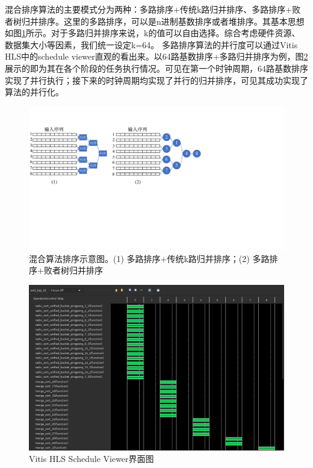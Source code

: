 混合排序算法的主要模式分为两种：多路排序+传统k路归并排序、多路排序+败者树归并排序。这里的多路排序，可以是n进制基数排序或者堆排序。其基本思想如图\ref{fig:k_way_sorting}所示。对于多路归并排序来说，k的值可以自由选择。综合考虑硬件资源、数据集大小等因素，我们统一设定k=64。
多路排序算法的并行度可以通过Vitis HLS中的schedule viewer直观的看出来。以64路基数排序+多路归并排序为例，图\ref{fig:schedule_viewer}展示的即为其在各个阶段的任务执行情况。可见在第一个时钟周期，64路基数排序实现了并行执行；接下来的时钟周期均实现了并行的归并排序，可见其成功实现了算法的并行化。


\begin{figure}[htbp]
    \centering
    \includegraphics[width=\linewidth]{figures/k_way_sorting.pdf}
    \caption{混合算法排序示意图。(1) 多路排序+传统k路归并排序；(2) 多路排序+败者树归并排序}
    \label{fig:k_way_sorting}
\end{figure}


\begin{figure}[htbp]
    \centering
    \includegraphics[width=\linewidth]{figures/schedule_viewer.jpeg}
    \caption{Vitis HLS Schedule Viewer界面图}
    \label{fig:schedule_viewer}
\end{figure}



